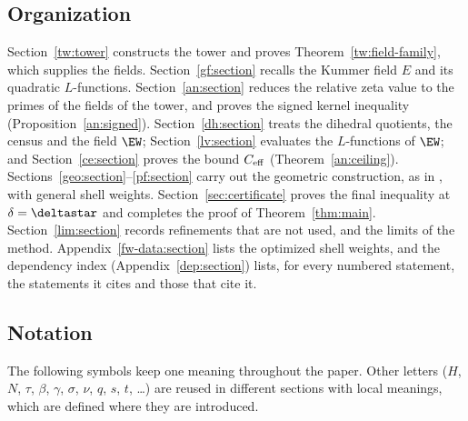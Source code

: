 \subsection{Organization}\label{intro:organization}
Section~\ref{tw:tower} constructs the tower and proves
Theorem~\ref{tw:field-family}, which supplies the fields.
Section~\ref{gf:section} recalls the Kummer field $E$ and its quadratic
$L$-functions. Section~\ref{an:section} reduces the relative zeta value
to the primes of the fields of the tower, and proves the signed kernel
inequality (Proposition~\ref{an:signed}). Section~\ref{dh:section} treats
the dihedral quotients, the census and the field $\EW$;
Section~\ref{lv:section} evaluates the $L$-functions of $\EW$; and
Section~\ref{ce:section} proves the bound $C_{\rm eff}$
(Theorem~\ref{an:ceiling}). Sections~\ref{geo:section}--\ref{pf:section}
carry out the geometric construction, as in \cite{Naslund04273}, with
general shell weights. Section~\ref{sec:certificate} proves the final
inequality at $\delta=\deltastar$ and completes the proof of
Theorem~\ref{thm:main}. Section~\ref{lim:section} records refinements that
are not used, and the limits of the method. Appendix~\ref{fw-data:section}
lists the optimized shell weights, and the dependency index
(Appendix~\ref{dep:section}) lists, for every numbered statement, the
statements it cites and those that cite it.

\subsection{Notation}\label{intro:notation}
The following symbols keep one meaning throughout the paper. Other letters
($H$, $N$, $\tau$, $\beta$, $\gamma$, $\sigma$, $\nu$, $q$, $s$, $t$, \dots)
are reused in different sections with local meanings, which are defined
where they are introduced.

